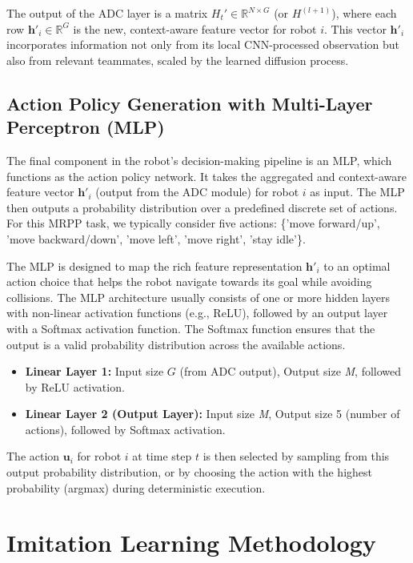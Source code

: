 The output of the ADC layer is a matrix $H_t' \in \mathbb{R}^{N \times G}$ (or $H^{(l+1)}$), where each row $\mathbf{h}'_i \in \mathbb{R}^G$ is the new, context-aware feature vector for robot $i$. This vector $\mathbf{h}'_i$ incorporates information not only from its local CNN-processed observation but also from relevant teammates, scaled by the learned diffusion process.

\subsection{Action Policy Generation with Multi-Layer Perceptron (MLP)}

The final component in the robot's decision-making pipeline is an MLP, which functions as the action policy network. It takes the aggregated and context-aware feature vector $\mathbf{h}'_i$ (output from the ADC module) for robot $i$ as input. The MLP then outputs a probability distribution over a predefined discrete set of actions. For this MRPP task, we typically consider five actions: \{'move forward/up', 'move backward/down', 'move left', 'move right', 'stay idle'\}.

The MLP is designed to map the rich feature representation $\mathbf{h}'_i$ to an optimal action choice that helps the robot navigate towards its goal while avoiding collisions. The MLP architecture usually consists of one or more hidden layers with non-linear activation functions (e.g., ReLU), followed by an output layer with a Softmax activation function. The Softmax function ensures that the output is a valid probability distribution across the available actions.


\begin{itemize}
    \item \textbf{Linear Layer 1:} Input size $G$ (from ADC output), Output size \textit{M}, followed by ReLU activation.
    \item \textbf{Linear Layer 2 (Output Layer):} Input size \textit{M}, Output size 5 (number of actions), followed by Softmax activation.
\end{itemize}

The action $\mathbf{u}_i$ for robot $i$ at time step $t$ is then selected by sampling from this output probability distribution, or by choosing the action with the highest probability (argmax) during deterministic execution.

\section{Imitation Learning Methodology}

